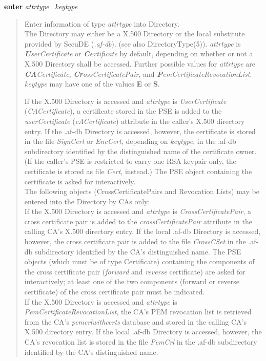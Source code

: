 {\bf enter} {\em attrtype}~ {\em keytype} 
\begin{quote}
Enter information of type {\em attrtype} into Directory. \\
The Directory may either be a X.500 Directory or the local substitute provided by 
SecuDE ({\em .af-db}). (see also DirectoryType(5)).
{\em attrtype} is {\em {\bf U}serCertificate} or {\em {\bf Ce}rtificate} by default, depending on whether
or not a X.500 Directory shall be accessed. Further possible values for {\em attrtype} are
{\em {\bf CA}Certificate}, {\em {\bf Cr}ossCertificatePair}, and {\em {\bf P}emCertificateRevocationList}.
{\em keytype} may have one of the values {\bf E} or {\bf S}.
 
If the X.500 Directory is accessed and {\em attrtype} is {\em UserCertificate} ({\em CACertificate}), a certificate stored in the PSE 
is added to the {\em userCertificate} ({\em cACertificate}) attribute in
the caller's X.500 directory entry.
If the .af-db Directory is accessed, however, the certificate is stored in the file {\em SignCert} or 
{\em EncCert}, depending on {\em keytype}, in the .af-db subdirectory identified by the distinguished name 
of the certificate owner. (If the caller's PSE is restricted to carry one RSA keypair only, the
certificate is stored as file {\em Cert}, instead.)
The PSE object containing the certificate is asked for interactively. \\
The following objects (CrossCertificatePairs and Revocation Lists) may be entered into 
the Directory by CAs only: \\
If the X.500 Directory is accessed and {\em attrtype} is {\em CrossCertificatePair}, 
a cross certificate pair 
is added to the {\em crossCertificatePair} attribute in the calling CA's X.500 directory entry. 
If the local .af-db Directory is accessed, however, the cross certificate pair is added to the 
file {\em CrossCSet}
in the .af-db subdirectory identified by the CA's distinguished name.
The PSE objects (which must be of type 
Certificate) containing the components of the cross certificate pair ({\em forward} and {\em reverse}
certificate) are asked for interactively; at least one of the two components (forward 
or reverse certificate) of the cross certificate pair must be indicated. \\
If the X.500 Directory is accessed and {\em attrtype} is {\em PemCertificateRevocationList}, 
the CA's PEM revocation list
is retrieved from the CA's {\em pemcrlwithcerts} database and stored in the calling CA's X.500 
directory entry.
If the local .af-db Directory is accessed, however, the CA's revocation list is stored in
the file {\em PemCrl} in the .af-db subdirectory identified by the CA's distinguished name. 
\end{quote}

